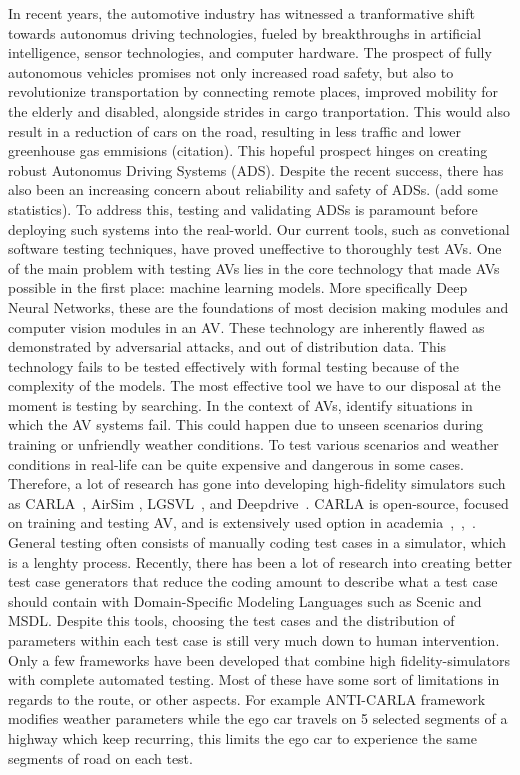 \documentclass[a4paper, 10pt, conference]{ieeeconf}
\begin{document}
In recent years, the automotive industry has witnessed a tranformative shift towards autonomus driving technologies, fueled by breakthroughs in artificial intelligence, sensor technologies, and computer hardware. The prospect of fully autonomous vehicles promises not only increased road safety, but also to revolutionize transportation by connecting remote places, improved mobility for the elderly and disabled, alongside strides in cargo tranportation. This would also result in a reduction of cars on the road, resulting in less traffic and lower greenhouse gas emmisions (citation). This hopeful prospect hinges on creating robust Autonomus Driving Systems (ADS). Despite the recent success, there has also been an increasing concern about reliability and safety of ADSs. (add some statistics). To address this, testing and validating ADSs is paramount before deploying such systems into the real-world. Our current tools, such as convetional software testing techniques, have proved uneffective to thoroughly test AVs. One of the main problem with testing AVs lies in the core technology that made AVs possible in the first place: machine learning models. More specifically Deep Neural Networks, these are the foundations of most decision making modules and computer vision modules in an AV. These technology are inherently flawed as demonstrated by adversarial attacks, and out of distribution data. This technology fails to be tested effectively with formal testing because of the complexity of the models. The most effective tool we have to our disposal at the moment is testing by searching. In the context of AVs, identify situations in which the AV systems fail. This could happen due to unseen scenarios during training or unfriendly weather conditions. To test various scenarios and weather conditions in real-life can be quite expensive and dangerous in some cases. Therefore, a lot of research has gone into developing high-fidelity simulators such as CARLA~\cite{dosovitskiy2017carla}, AirSim \cite{shah2018airsim}, LGSVL~\cite{rong2020lgsvl}, and Deepdrive~\cite{deepdrive_2020}. CARLA is open-source, focused on training and testing AV, and is extensively used option in academia~\cite{shao2023safety},~\cite{wu2022trajectory},~\cite{chen2020learning}. General testing often consists of manually coding test cases in a simulator, which is a lenghty process. Recently, there has been a lot of research into creating better test case generators that reduce the coding amount to describe what a test case should contain with Domain-Specific Modeling Languages such as Scenic and MSDL. Despite this tools, choosing the test cases and the distribution of parameters within each test case is still very much down to human intervention. Only a few frameworks have been developed that combine high fidelity-simulators with complete automated testing. Most of these have some sort of limitations in regards to the route, or other aspects. For example ANTI-CARLA framework modifies weather parameters while the ego car travels on 5 selected segments of a highway which keep recurring, this limits the ego car to experience the same segments of road on each test.
\end{document}
